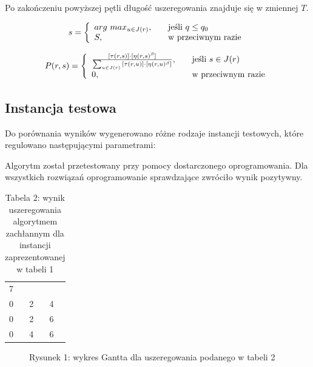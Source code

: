 \documentclass[10pt,a4paper]{article}
\begin{document}
Po zakończeniu powyższej pętli długość uszeregowania znajduje się w zmiennej $T$. 


\begin{equation}
 s = \left\{ 
  \begin{array}{l l}
    arg\ max_{u \in J(r)}, & \quad \text{jeśli $q\leq q_0$}\\
    S, & \quad \text{w przeciwnym razie}
  \end{array} \right.
\end{equation}

\begin{equation}
 P(r,s) = \left\{ 
  \begin{array}{l l}
    \frac{[\tau (r,s)] \cdot [\eta (r,s)^\beta]}{\sum_{u \in J(r)} {[\tau (r,u)] \cdot [\eta (r,u)^\beta]}},
    & \quad \text{jeśli }s \in J(r)\\
     0, & \quad \text{w przeciwnym razie}
  \end{array} \right.
\end{equation}

\subsection{Instancja testowa}
Do porównania wyników wygenerowano różne rodzaje instancji testowych, które regulowano następującymi parametrami:

Algorytm został przetestowany przy pomocy dostarczonego oprogramowania. Dla wszystkich rozwiązań oprogramowanie sprawdzające zwróciło wynik pozytywny.

\begin{table}[H]
    \begin{center}
        \begin{tabular}{ l l l }
            7 & &\\
            0 & 2 & 4\\
            0 & 2 & 6\\
            0 & 4 & 6
        \end{tabular}
        \caption*{Tabela 2: wynik uszeregowania algorytmem zachłannym dla instancji zaprezentowanej w tabeli 1}
    \end{center}
\end{table}

\begin{figure}[H]
    \centering
    \caption*{Rysunek 1: wykres Gantta dla uszeregowania podanego w tabeli 2}
\end{figure}
\end{document}
